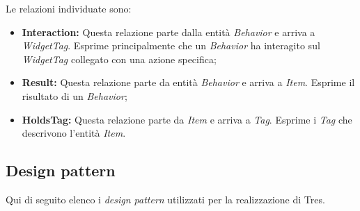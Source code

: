 Le relazioni individuate sono:
\begin{itemize}
\item \textbf{Interaction:} Questa relazione parte dalla entità \emph{Behavior} e arriva a \emph{WidgetTag}. Esprime principalmente che un \emph{Behavior} ha interagito sul \emph{WidgetTag} collegato con una azione specifica;
\item \textbf{Result:} Questa relazione parte da entità \emph{Behavior} e arriva a \emph{Item}. Esprime il risultato di un \emph{Behavior};
\item \textbf{HoldsTag:} Questa relazione parte da \emph{Item} e arriva a \emph{Tag}. Esprime i \emph{Tag} che descrivono l'entità \emph{Item}.
\end{itemize}

\newpage
\subsection{Design pattern}
Qui di seguito elenco i \emph{design pattern} utilizzati per la realizzazione di Tres.
